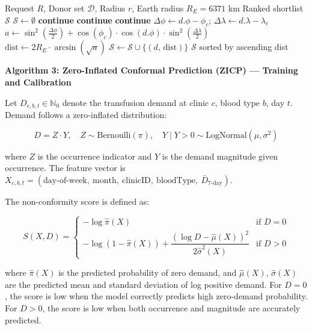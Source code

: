 \documentclass[12pt,a4paper]{article}
\begin{document}
\begin{algorithm}[H]
\caption{Haversine-based Geospatial Matching Algorithm (GMA)}
\begin{algorithmic}[1]
\Require Request $R$, Donor set $\mathcal{D}$, Radius $r$, Earth radius $R_E = 6371$ km
\Ensure Ranked shortlist $\mathcal{S}$
\State $\mathcal{S} \leftarrow \emptyset$
     \textbf{continue} \EndIf
     \textbf{continue} \EndIf
     \textbf{continue} \EndIf
    \State $\Delta\phi \leftarrow d.\phi - \phi_c$; \quad $\Delta\lambda \leftarrow d.\lambda - \lambda_c$
    \State $a \leftarrow \sin^2\!\left(\frac{\Delta\phi}{2}\right) + \cos(\phi_c) \cdot \cos(d.\phi) \cdot \sin^2\!\left(\frac{\Delta\lambda}{2}\right)$
    \State $\text{dist} \leftarrow 2 R_E \cdot \arcsin\!\left(\sqrt{a}\right)$
        \State $\mathcal{S} \leftarrow \mathcal{S} \cup \{(d,\, \text{dist})\}$
    \EndIf
\EndFor
\State \Return $\mathcal{S}$ sorted by ascending dist
\end{algorithmic}
\end{algorithm}

\vspace{1.2em}
\noindent\textbf{Algorithm 3: Zero-Inflated Conformal Prediction (ZICP) — Training and Calibration}
\vspace{0.5em}

\noindent Let $D_{c,b,t} \in \mathbb{N}_0$ denote the transfusion demand at clinic $c$, blood type $b$, day $t$. Demand follows a zero-inflated distribution:

\[
D = Z \cdot Y, \quad Z \sim \text{Bernoulli}(\pi), \quad Y \mid Y > 0 \sim \text{LogNormal}(\mu, \sigma^2)
\]

\noindent where $Z$ is the occurrence indicator and $Y$ is the demand magnitude given occurrence. The feature vector is $X_{c,b,t} = (\text{day-of-week},\ \text{month},\ \text{clinicID},\ \text{bloodType},\ \bar{D}_{7\text{-day}})$.

\noindent The non-conformity score is defined as:

\[
S(X, D) = \begin{cases}
-\log \hat{\pi}(X) & \text{if } D = 0 \\
-\log(1 - \hat{\pi}(X)) + \dfrac{(\log D - \hat{\mu}(X))^2}{2\hat{\sigma}^2(X)} & \text{if } D > 0
\end{cases}
\]

\noindent where $\hat{\pi}(X)$ is the predicted probability of zero demand, and $\hat{\mu}(X)$, $\hat{\sigma}(X)$ are the predicted mean and standard deviation of log positive demand. For $D = 0$, the score is low when the model correctly predicts high zero-demand probability. For $D > 0$, the score is low when both occurrence and magnitude are accurately predicted.
\end{document}
